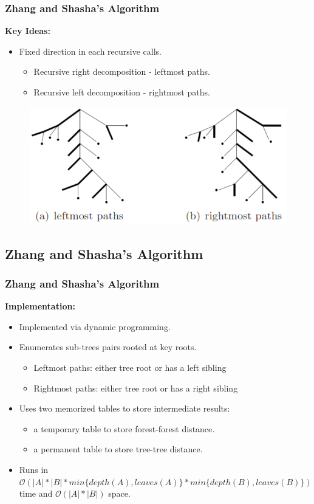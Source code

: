 \documentclass{beamer}
\begin{document}
\begin{frame}
\frametitle{Zhang and Shasha's Algorithm}
\textbf{Key Ideas:}
\begin{itemize}
\item Fixed direction in each recursive calls.
\begin{itemize}
\item Recursive right decomposition - leftmost paths.
\item Recursive left decomposition - rightmost paths.
\end{itemize}
\end{itemize}
\begin{figure}
	\includegraphics[width=0.7\linewidth]{LeftmostPathandRightmostPath}
	\centering
\end{figure}
\end{frame}
\subsection{Zhang and Shasha's Algorithm}
\begin{frame}
\frametitle{Zhang and Shasha's Algorithm}
\textbf{Implementation:}
\begin{itemize}
\item Implemented via dynamic programming.
\item Enumerates sub-trees pairs rooted at key roots.
\begin{itemize}
\item Leftmost paths: either tree root or has a left sibling
\item Rightmost paths: either tree root or has a right sibling
\end{itemize}
\item Uses two memorized tables to store intermediate results:
\begin{itemize}
\item a temporary table to store forest-forest distance.%
\item a permanent table to store tree-tree distance.
\end{itemize} 
\item Runs in $\mathcal{O}(\left\vert A \right\vert * \left\vert B \right\vert *min\{depth(A), leaves(A)\}*min\{depth(B), leaves(B)\})$ time and $\mathcal{O}(\left\vert A \right\vert * \left\vert B \right\vert)$ space. 
\end{itemize}
\end{frame}
\end{document}

